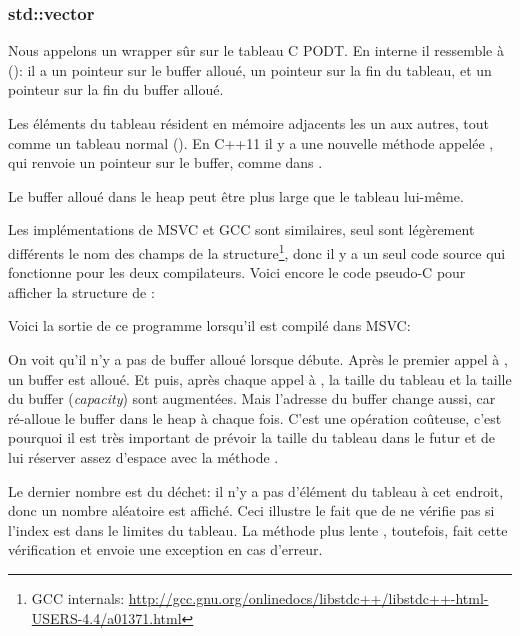 \subsubsection{std::vector}

Nous appelons  un wrapper sûr sur le tableau C \ac{PODT}.
En interne il ressemble à  ():
il a un pointeur sur le buffer alloué, un pointeur sur la fin du tableau, et un pointeur
sur la fin du buffer alloué.

Les éléments du tableau résident en mémoire adjacents les un aux autres, tout comme
un tableau normal ().
En C++11 il y a une nouvelle méthode appelée , qui renvoie un pointeur
sur le buffer, comme  dans .

Le buffer alloué dans le \gls{heap} peut être plus large que le tableau lui-même.

Les implémentations de MSVC et GCC sont similaires, seul sont légèrement différents
le nom des champs de la structure\footnote{GCC internals: \url{http://gcc.gnu.org/onlinedocs/libstdc++/libstdc++-html-USERS-4.4/a01371.html}},
donc il y a un seul code source qui fonctionne pour les deux compilateurs.
Voici encore le code pseudo-C pour afficher la structure de :



Voici la sortie de ce programme lorsqu'il est compilé dans MSVC:



On voit qu'il n'y a pas de buffer alloué lorsque \main débute.
Après le premier appel à , un buffer est alloué.
Et puis, après chaque appel à , la taille du tableau et la taille
du buffer (\emph{capacity}) sont augmentées.
Mais l'adresse du buffer change aussi, car  ré-alloue le buffer dans
le \gls{heap} à chaque fois.
C'est une opération coûteuse, c'est pourquoi il est très important de prévoir la
taille du tableau dans le futur et de lui réserver assez d'espace avec la méthode
.

Le dernier nombre est du déchet: il n'y a pas d'élément du tableau à cet endroit,
donc un nombre aléatoire est affiché.
Ceci illustre le fait que  de  ne vérifie pas si l'index
est dans le limites du tableau.
La méthode plus lente , toutefois, fait cette vérification et envoie une
exception  en cas d'erreur.

